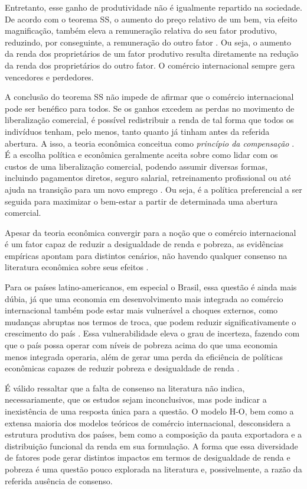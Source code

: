 Entretanto, esse ganho de produtividade não é igualmente repartido na sociedade. De acordo com o teorema SS, o aumento do preço relativo de um bem, via efeito magnificação, também eleva a remuneração relativa do seu fator produtivo, reduzindo, por conseguinte, a remuneração do outro fator \cite{stolper41}. Ou seja, o aumento da renda dos proprietários de um fator produtivo resulta diretamente na redução da renda dos proprietários do outro fator. O comércio internacional sempre gera vencedores e perdedores.

A conclusão do teorema SS não impede de afirmar que o comércio internacional pode ser benéfico para todos. Se os ganhos excedem as perdas no movimento de liberalização comercial, é possível redistribuir a renda de tal forma que todos os indivíduos tenham, pelo menos, tanto quanto já tinham antes da referida abertura. A isso, a teoria econômica conceitua como \textit{princípio da compensação} \cite{irwin98}. É a escolha política e econômica geralmente aceita sobre como lidar com os custos de uma liberalização comercial, podendo assumir diversas formas, incluindo pagamentos diretos, seguro salarial, retreinamento profissional ou até ajuda na transição para um novo emprego \cite{kolben21}. Ou seja, é a política preferencial a ser seguida para maximizar o bem-estar a partir de determinada uma abertura comercial.

Apesar da teoria econômica convergir para a noção que o comércio internacional é um fator capaz de reduzir a desigualdade de renda e pobreza, as evidências empíricas apontam para distintos cenários, não havendo qualquer consenso na literatura econômica sobre seus efeitos \cite{winters04}. 

Para os países latino-americanos, em especial o Brasil, essa questão é ainda mais dúbia, já que uma economia em desenvolvimento mais integrada ao comércio internacional também pode estar mais vulnerável a choques externos, como mudanças abruptas nos termos de troca, que podem reduzir significativamente o crescimento do país \cite{bannisterthugge01}. Essa vulnerabilidade eleva o grau de incerteza, fazendo com que o país possa operar com níveis de pobreza acima do que uma economia menos integrada operaria, além de gerar uma perda da eficiência de políticas econômicas capazes de reduzir pobreza e desigualdade de renda \cite{winters02}.

É válido ressaltar que a falta de consenso na literatura não indica, necessariamente, que os estudos sejam inconclusivos, mas pode indicar a inexistência de uma resposta única para a questão. O modelo H-O, bem como a extensa maioria dos modelos teóricos de comércio internacional, desconsidera a estrutura produtiva dos países, bem como a composição da pauta exportadora e a distribuição funcional da renda em sua formulação. A forma que essa diversidade de fatores pode gerar distintos impactos em termos de desigualdade de renda e pobreza é uma questão pouco explorada na literatura e, possivelmente, a razão da referida ausência de consenso.

